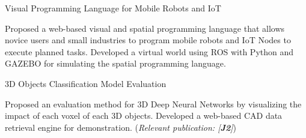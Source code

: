 \begin{cventries}

\cvpub
{Visual Programming Language for Mobile Robots and IoT} %
{ %
\begin{cvitems}
\item {Proposed a web-based visual and spatial programming language that allows novice users and small industries to program mobile robots and IoT Nodes to execute planned tasks. Developed a virtual world using ROS with Python and GAZEBO for simulating the spatial programming language.}
\end{cvitems} 
}


\cvpub
{3D Objects Classification Model Evaluation} %
{ %
\begin{cvitems}
\item {Proposed an evaluation method for 3D Deep Neural Networks by visualizing the impact of each voxel of each 3D objects. Developed a web-based CAD data retrieval engine for demonstration. (\textit{Relevant publication: [\textbf{J2}]})}
\end{cvitems}
}


\end{cventries}
